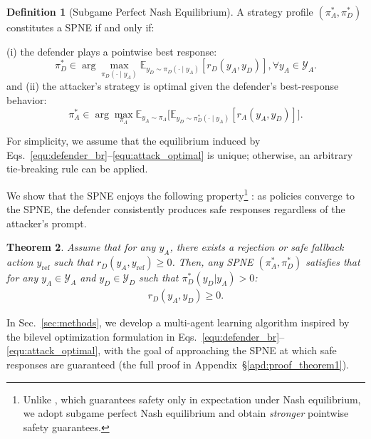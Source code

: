 \documentclass[11pt, letterpaper]{template}
\theoremstyle{plain}
\newtheorem{theorem}{Theorem}[section]
\theoremstyle{definition}
\newtheorem{definition}[theorem]{Definition}
\theoremstyle{remark}
\begin{document}
\begin{definition}[Subgame Perfect Nash Equilibrium]
 
A strategy profile  $(\pi_A^{*},\pi_D^{*})$ constitutes a SPNE if and only if:

(i) the defender plays a pointwise best response:
\begin{equation}
    \label{equ:defender_br}
    \pi_D^{*} \in \arg \max_{\pi_D(\cdot \mid y_A)} \mathbb{E}_{y_D \sim \pi_D(\cdot \mid y_A)}[ r_D(y_A,y_D)],  \forall y_A \in \mathcal{Y}_A.
\end{equation}
and
(ii) the attacker’s strategy is optimal given the defender’s best-response behavior:
\begin{equation}
    \label{equ:attack_optimal}
    \pi_A^{*} \in \arg \max_{\pi_A} \mathbb{E}_{y_A \sim \pi_A} \big[ \mathbb{E}_{y_D \sim \pi_D^{*}(\cdot \mid y_A)}[r_A(y_A,y_D) ] \big].
\end{equation}
\end{definition}
For simplicity, we assume that the equilibrium induced by Eqs.~\eqref{equ:defender_br}--\eqref{equ:attack_optimal} is unique; otherwise, an arbitrary tie-breaking rule can be applied.


We show that the SPNE enjoys the following property\footnote{Unlike \citet{liu2025chasing}, which guarantees safety only in expectation under Nash equilibrium, we adopt subgame perfect Nash equilibrium and obtain \textit{stronger} pointwise safety guarantees.}
: as policies converge to the SPNE, the defender consistently produces safe responses regardless of the attacker’s prompt.
\begin{theorem}
\label{theorem:eq}
Assume that for any $y_A$, there exists a rejection or safe fallback action $y_{\text{ref}}$ such that $r_D(y_A,y_{\text{ref}}) \geq 0$. Then, any SPNE $(\pi_A^{*},\pi_D^{*})$ satisfies that for any $y_A \in \mathcal{Y}_A$ and $y_D \in \mathcal{Y}_D$ such that $\pi_D^{*}(y_D|y_A)>0$:
\begin{equation}
\begin{aligned}
    r_D(y_A,y_D) \geq 0.
\end{aligned}
\end{equation}

\end{theorem}

In Sec.~\ref{sec:methods}, we develop a multi-agent learning algorithm inspired by the bilevel optimization formulation in Eqs.~\eqref{equ:defender_br}--\eqref{equ:attack_optimal}, with the goal of approaching the SPNE at which safe responses are guaranteed (the full proof in Appendix~\S\ref{apd:proof_theorem1}).
\end{document}
